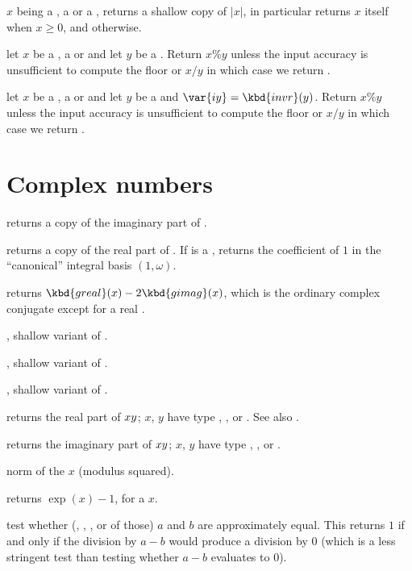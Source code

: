  $x$ being a , a  or a
, returns a shallow copy of $|x|$, in particular returns $x$ itself
when $x \geq 0$, and  otherwise.

 let $x$ be a , a  or
 and let $y$ be a . Return $x\% y$ unless the input
accuracy is unsufficient to compute the floor or $x/y$ in which case we
return .

 let $x$ be a , a  or
 and let $y$ be a  and $\var{iy} = \kbd{invr}(y)$. Return
$x\% y$ unless the input
accuracy is unsufficient to compute the floor or $x/y$ in which case we
return .

\section{Complex numbers}

 returns a copy of the imaginary part of .

 returns a copy of the real part of . If 
is a , returns the coefficient of $1$ in the ``canonical'' integral
basis $(1,\omega)$.

 returns $\kbd{greal}(x) - 2\kbd{gimag}(x)$, which is
the ordinary complex conjugate except for a real .

, shallow variant of .

, shallow variant of .

, shallow variant of .

 returns the real part of $x\*y$;
$x$, $y$ have type , ,  or . See also
.

 returns the imaginary part of $x\*y$;
$x$, $y$ have type , ,  or .

 norm of the  $x$ (modulus squared).

 returns $\exp(x)-1$, for a  $x$.

 test whether (, ,
, or  of those) $a$ and $b$ are approximately equal.
This returns $1$ if and only if the division by $a-b$ would produce a
division by $0$ (which is a less stringent test than testing whether $a-b$
evaluates to $0$).

